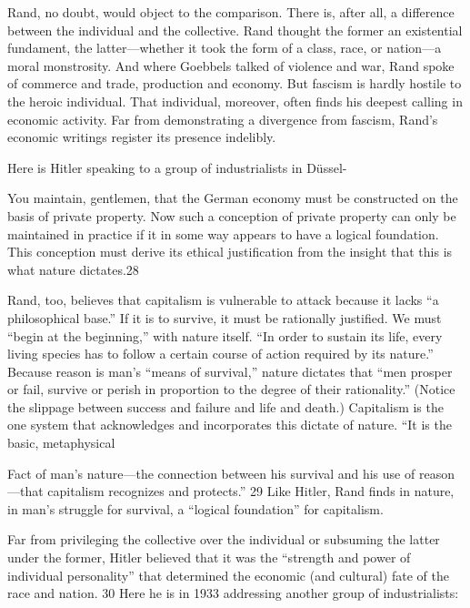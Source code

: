  \par 
Rand, no doubt, would object to the comparison. There is, after all, a difference between the individual and the collective. Rand thought the former an existential fundament, the latter—whether it took the form of a class, race, or nation—a moral monstrosity. And where Goebbels talked of violence and war, Rand spoke of commerce and trade, production and economy. But fascism is hardly hostile to the heroic individual. That individual, moreover, often finds his deepest calling in economic activity. Far from demonstrating a divergence from fascism, Rand’s economic writings register its presence indelibly.
 \par 
Here is Hitler speaking to a group of industrialists in Düssel-
 \par 
You maintain, gentlemen, that the German economy must be constructed on the basis of private property. Now such a conception of private property can only be maintained in practice if it in some way appears to have a logical foundation. This conception must derive its ethical justification from the insight that this is what nature dictates.{\color{blue}28}
 \par 
Rand, too, believes that capitalism is vulnerable to attack because it lacks “a philosophical base.” If it is to survive, it must be rationally justified. We must “begin at the beginning,” with nature itself. “In order to sustain its life, every living species has to follow a certain course of action required by its nature.” Because reason is man’s “means of survival,” nature dictates that “men prosper or fail, survive or perish in proportion to the degree of their rationality.” (Notice the slippage between success and failure and life and death.) Capitalism is the one system that acknowledges and incorporates this dictate of nature. “It is the basic, metaphysical
 \par 
Fact of man’s nature—the connection between his survival and his use of reason—that capitalism recognizes and protects.” {\color{blue}29} Like Hitler, Rand finds in nature, in man’s struggle for survival, a “logical foundation” for capitalism.
 \par 
Far from privileging the collective over the individual or subsuming the latter under the former, Hitler believed that it was the “strength and power of individual personality” that determined the economic (and cultural) fate of the race and nation. {\color{blue}30} Here he is in 1933 addressing another group of industrialists:
 \par 
